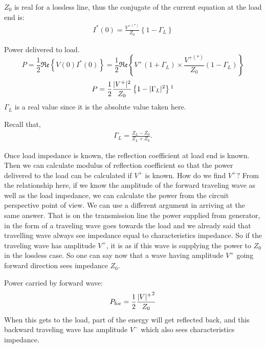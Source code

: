 $Z_0$ is real for a lossless line, thus the conjugate of the current equation at the load end is:
\begin{align*}
I^\ast (0) =\frac{V^{+ (\ast )}}{Z_0}\left\lbrace 1 -\Gamma_L \right\rbrace
\end{align*}

Power delivered to load.
\begin{dmath*}
P = \frac{1}{2}\mathfrak{Re}\left\lbrace V(0) I^\ast(0) \right\rbrace= \frac{1}{2}\mathfrak{Re}\left\lbrace V^+(1+\Gamma_L) \times\frac{V^{+(\ast)}}{Z_0} (1-\Gamma_L)\right\rbrace
\end{dmath*}
\begin{equation}
P = \frac{1}{2} \frac{|V^+|^2}{Z_0} \left\lbrace 1 -|\Gamma_L|^2 \right\rbrace\footnotemark
\end{equation}
$\Gamma_L$ is a real value since it is the absolute value taken here.

Recall that,
\begin{align*}\Gamma_L = \frac{ Z_L -Z_0 }{ Z_L + Z_0 }.
\end{align*}

Once load impedance is known, the reflection coefficient at load end is known. Then we can calculate modulus of reflection coefficient so that the power delivered to the load can be calculated if $V^+$ is known. How do we find $V^+ ? $ From the relationship here, if we know the amplitude of the forward traveling wave as well as the load impedance, we can calculate the power from the circuit perspective point of view. We can use a different argument in arriving at the same answer. That is on the transmission line the power supplied from generator, in the form of a traveling wave goes towards the load and we already said that travelling wave always see impedance equal to characteristics impedance. So if the traveling wave has amplitude $V^+$, it is as if this wave is supplying the power to $Z_0$ in the lossless case. So one can say now that  a wave having amplitude $V^+$ going forward direction sees impedance $Z_0$.

Power carried by forward wave:  
\begin{align*}
P_{\textnormal{for}} = \frac{1}{2} \frac{{|V|^+}^2}{Z_0}
\end{align*}
When this gets to the load, part of the energy will get reflected back, and this backward traveling wave has amplitude $V^-$ which also sees characteristics impedance.

